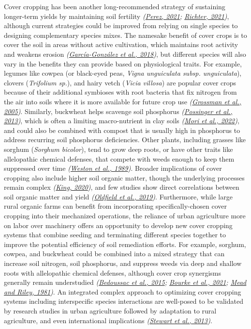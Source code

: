 \documentclass[
  12pt,
]{article}
\begin{document}
Cover cropping has been another long-recommended strategy of sustaining longer-term yields by maintaining soil fertility \emph{(\protect\hyperlink{ref-perez21}{Perez, 2021}; \protect\hyperlink{ref-richter21}{Richter, 2021})}, although current strategies could be improved from relying on single species to designing complementary species mixes.
The namesake benefit of cover crops is to cover the soil in areas without active cultivation, which maintains root activity and weakens erosion \emph{(\protect\hyperlink{ref-garcia-gonzalez18}{García-González et al., 2018})}, but different species will also vary in the benefits they can provide based on physiological traits.
For example, legumes like cowpea (or black-eyed peas, \emph{Vigna unguiculata subsp. unguiculata}), clovers (\emph{Trifolium sp.}), and hairy vetch (\emph{Vicia villosa}) are popular cover crops because of their additional symbioses with root bacteria that fix nitrogen from the air into soils where it is more available for future crop use \emph{(\protect\hyperlink{ref-grossman05}{Grossman et al., 2005})}.
Similarly, buckwheat helps scavenge soil phosphorus \emph{(\protect\hyperlink{ref-possinger13}{Possinger et al., 2013})}, which is often a limiting macro-nutrient in clay soils \emph{(\protect\hyperlink{ref-mori22}{Mori et al., 2022})}, and could also be combined with compost that is usually high in phosphorus to address recurring soil phosphorus deficiencies.
Other plants, including grasses like sorghum (\emph{Sorghum bicolor}), tend to grow deep roots, or have other traits like allelopathic chemical defenses, that compete with weeds enough to keep them suppressed over time \emph{(\protect\hyperlink{ref-weston89}{Weston et al., 1989})}.
Broader implications of cover cropping also include higher soil organic matter, though the underlying processes remain complex \emph{(\protect\hyperlink{ref-king20}{King, 2020})}, and few studies show direct correlations between soil organic matter and yield \emph{(\protect\hyperlink{ref-oldfield19}{Oldfield et al., 2019})}.
Furthermore, while large rural organic farms can benefit from incorporating specifically-chosen cover cropping into their mechanized operations, the reliance of urban agriculture more on labor over machinery offers an opportunity to develop new cover cropping systems that combine seeding and terminating different species together to improve the potential efficiency of soil remediation efforts.
For example, sorghum, cowpea, and buckwheat could be combined into a mixed strategy that can increase soil nitrogen, soil phosphorus, and suppress weeds via deep and shallow roots with allelopathic chemical defenses, although cover crop synergisms generally remain understudied \emph{(\protect\hyperlink{ref-bedoussac15}{Bedoussac et al., 2015}; \protect\hyperlink{ref-bourke21}{Bourke et al., 2021}; \protect\hyperlink{ref-mead81}{Mead and Riley, 1981})}.
An integrated complex approach to optimizing cover cropping systems including interspecific species interactions are well-posed to be validated by research studies in urban agriculture followed by adaptation to rural agriculture, and even international implications \emph{(\protect\hyperlink{ref-stewart13}{Stewart et al., 2013})}.
\end{document}
